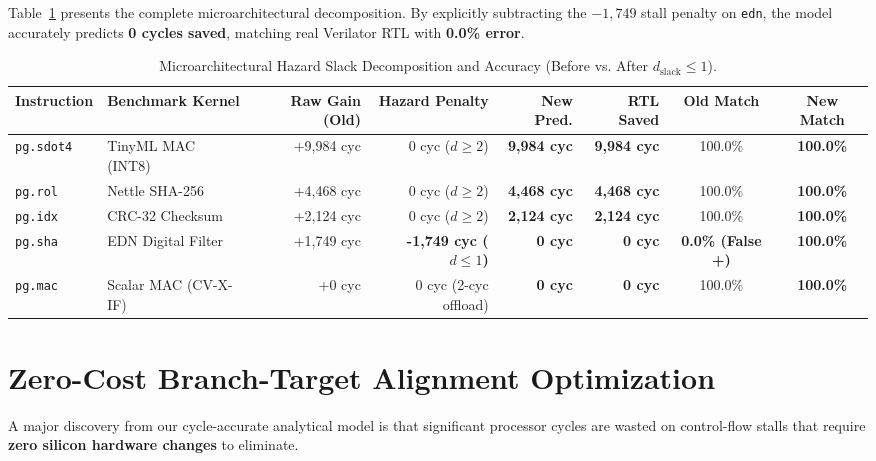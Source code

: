 \documentclass[11pt,a4paper]{article}
\begin{document}
Table~\ref{tab:hazard_validation} presents the complete microarchitectural decomposition. By explicitly subtracting the $-1,749$ stall penalty on \texttt{edn}, the model accurately predicts \textbf{0 cycles saved}, matching real Verilator RTL with \textbf{0.0\% error}.

\begin{table}[h!]
\centering
\small
\setlength{\tabcolsep}{3pt}
\begin{tabularx}{\textwidth}{l l r r r r c c}
\toprule
\textbf{Instruction} & \textbf{Benchmark Kernel} & \textbf{Raw Gain (Old)} & \textbf{Hazard Penalty} & \textbf{New Pred.} & \textbf{RTL Saved} & \textbf{Old Match} & \textbf{New Match} \\
\midrule
\texttt{pg.sdot4} & TinyML MAC (INT8)   & +9,984 cyc & 0 cyc ($d \ge 2$)  & \textbf{9,984 cyc} & \textbf{9,984 cyc} & 100.0\% & \textbf{100.0\%} \\
\texttt{pg.rol}   & Nettle SHA-256      & +4,468 cyc & 0 cyc ($d \ge 2$)  & \textbf{4,468 cyc} & \textbf{4,468 cyc} & 100.0\% & \textbf{100.0\%} \\
\texttt{pg.idx}   & CRC-32 Checksum     & +2,124 cyc & 0 cyc ($d \ge 2$)  & \textbf{2,124 cyc} & \textbf{2,124 cyc} & 100.0\% & \textbf{100.0\%} \\
\texttt{pg.sha}   & EDN Digital Filter  & \textcolor{warningred}{+1,749 cyc} & \textbf{-1,749 cyc ($d \le 1$)} & \textbf{0 cyc} & \textbf{0 cyc} & \textcolor{warningred}{\textbf{0.0\% (False +)}} & \textbf{\textcolor{successgreen}{100.0\%}} \\
\texttt{pg.mac}   & Scalar MAC (CV-X-IF)& +0 cyc     & 0 cyc (2-cyc offload) & \textbf{0 cyc} & \textbf{0 cyc} & 100.0\% & \textbf{100.0\%} \\
\bottomrule
\end{tabularx}
\caption{Microarchitectural Hazard Slack Decomposition and Accuracy (Before vs. After $d_{\text{slack}} \le 1$).}
\label{tab:hazard_validation}
\end{table}

\section{Zero-Cost Branch-Target Alignment Optimization}

A major discovery from our cycle-accurate analytical model is that significant processor cycles are wasted on control-flow stalls that require \textbf{zero silicon hardware changes} to eliminate.
\end{document}
